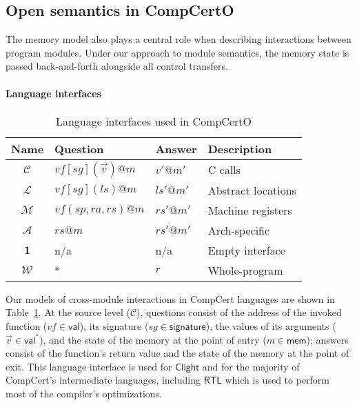 \documentclass[acmsmall,authordraft]{acmart}
\newcommand{\kw}[1]{\ensuremath{ \mathsf{#1} }}
\begin{document}

\subsection{Open semantics in CompCertO} \label{sec:sem:open} %

The memory model also plays a central role
when describing interactions between program modules.
Under our approach to module semantics,
the memory state is passed back-and-forth
alongside all control transfers.

\paragraph{Language interfaces} %

\begin{table} %
  \begin{tabular}{clll}
    \hline
    Name & Question & Answer & Description \\
    \hline
    $\mathcal{C}$ &
      $\mathit{vf}[\mathit{sg}](\vec{v})@m$ & $v'@m'$ &
      C calls \\
    $\mathcal{L}$ &
      $\mathit{vf}[\mathit{sg}](\mathit{ls})@m$ & $\mathit{ls}'@m'$ &
      Abstract locations \\
    $\mathcal{M}$ &
      $\mathit{vf}(\mathit{sp},\mathit{ra},\mathit{rs})@m$ & $\mathit{rs}'@m'$ &
      Machine registers \\
    $\mathcal{A}$ &
      $\mathit{rs}@m$ & $\mathit{rs}'@m'$ &
      Arch-specific \\
    $\mathbf{1}$ & n/a & n/a &
      Empty interface \\
    $\mathcal{W}$ & * & $r$ &
      Whole-program \\
    \hline
  \end{tabular}
  \caption{Language interfaces used in CompCertO}
  \label{tbl:li}
\end{table}

Our models of cross-module interactions in CompCert languages
are shown in Table~\ref{tbl:li}.
At the source level ($\mathcal{C}$),
questions consist of
the address of the invoked function
($\mathit{vf} \in \kw{val}$),
its signature
($\mathit{sg} \in \kw{signature}$),
the values of its arguments
($\vec{v} \in \kw{val}^*$),
and the state of the memory at the point of entry
($m \in \kw{mem}$);
answers
consist of the function's return value
and the state of the memory at the point of exit.
This language interface is used for \kw{Clight} and
for the majority of CompCert's intermediate languages,
including \kw{RTL} which is used to perform
most of the compiler's optimizations.
\end{document}

